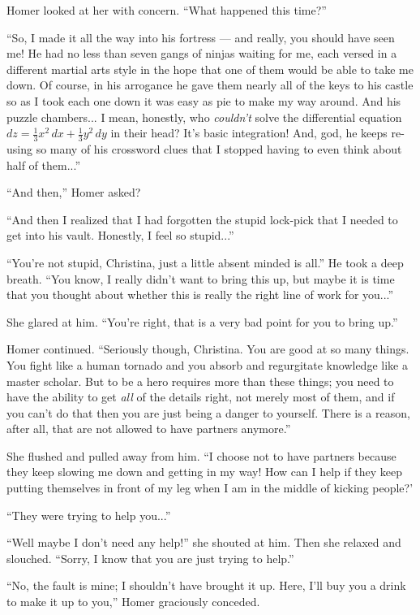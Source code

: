 \documentclass[showtrims,b6paper,draft,10pt]{memoir}
\begin{document}
Homer looked at her with concern.  ``What happened this time?''

``So, I made it all the way into his fortress --- and really, you should have seen me!  He had no less than seven gangs of ninjas waiting for me, each versed in a different martial arts style in the hope that one of them would be able to take me down.  Of course, in his arrogance he gave them nearly all of the keys to his castle so as I took each one down it was easy as pie to make my way around.  And his puzzle chambers... I mean, honestly, who \emph{couldn't} solve the differential equation $dz=\frac{1}{3}x^2\,dx+\frac{1}{3}y^2\,dy$ in their head?  It's basic integration!  And, god, he keeps re-using so many of his crossword clues that I stopped having to even think about half of them...''

``And then,''  Homer asked?

``And then I realized that I had forgotten the stupid lock-pick that I needed to get into his vault.  Honestly, I feel so stupid...''

``You're not stupid, Christina, just a little absent minded is all.''  He took a deep breath.  ``You know, I really didn't want to bring this up, but maybe it is time that you thought about whether this is really the right line of work for you...''

She glared at him.  ``You're right, that is a very bad point for you to bring up.''

Homer continued.  ``Seriously though, Christina.  You are good at so many things.  You fight like a human tornado and you absorb and regurgitate knowledge like a master scholar.  But to be a hero requires more than these things;  you need to have the ability to get \emph{all} of the details right, not merely most of them, and if you can't do that then you are just being a danger to yourself.  There is a reason, after all, that are not allowed to have partners anymore.''

She flushed and pulled away from him.  ``I choose not to have partners because they keep slowing me down and getting in my way!  How can I help if they keep putting themselves in front of my leg when I am in the middle of kicking people?'

``They were trying to help you...''

``Well maybe I don't need any help!'' she shouted at him.  Then she relaxed and slouched.  ``Sorry, I know that you are just trying to help.''

``No, the fault is mine;  I shouldn't have brought it up.  Here, I'll buy you a drink to make it up to you,'' Homer graciously conceded.
\end{document}
